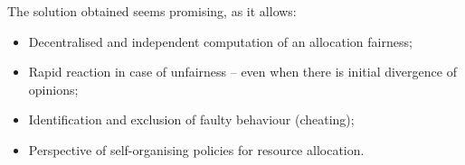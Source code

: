 \documentclass[conference,compsoc]{IEEEtran}
\begin{document}
The solution obtained seems promising, as it allows:

\begin{itemize}
    \item Decentralised and independent computation of an allocation fairness;
    \item Rapid reaction in case of unfairness -- even when there is initial divergence of opinions;
    \item Identification and exclusion of faulty behaviour (cheating);
    \item Perspective of self-organising policies for resource allocation.
\end{itemize}






%
%

\end{document}
